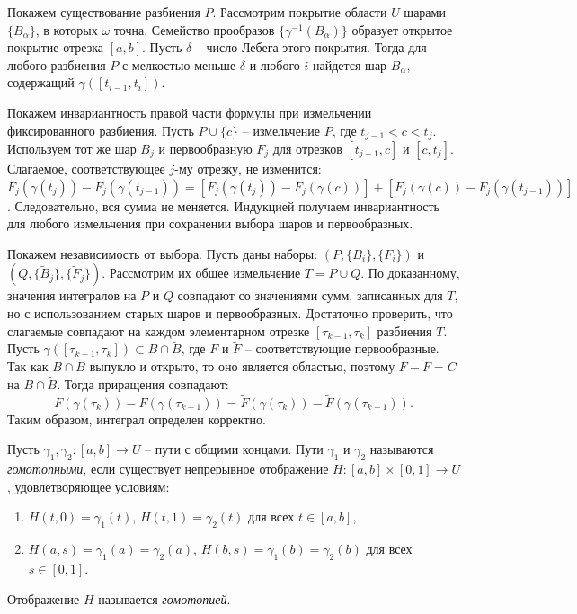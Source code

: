 \begin{myproof}
	Покажем существование разбиения $P$. 
	Рассмотрим покрытие области $U$ шарами $\{B_\alpha\}$, в которых $\omega$ точна. Семейство прообразов $\{\gamma^{-1}(B_\alpha)\}$ образует открытое покрытие отрезка $[a, b]$. Пусть $\delta$ -- число Лебега этого покрытия. Тогда для любого разбиения $P$ с мелкостью меньше $\delta$ и любого $i$ найдется шар $B_{\alpha}$, содержащий $\gamma([t_{i-1}, t_i])$.

	\vspace{5pt}
	Покажем инвариантность правой части формулы при измельчении фиксированного разбиения.
	Пусть $P \cup \{c\}$ -- измельчение $P$, где $t_{j-1} < c < t_j$. Используем тот же шар $B_j$ и первообразную $F_j$ для отрезков $[t_{j-1}, c]$ и $[c, t_j]$. Слагаемое, соответствующее $j$-му отрезку, не изменится:
 	$F_j(\gamma(t_j)) - F_j(\gamma(t_{j-1})) = \left[F_j(\gamma(t_j)) - F_j(\gamma(c))\right] + \left[F_j(\gamma(c)) - F_j(\gamma(t_{j-1}))\right]$.
	Следовательно, вся сумма не меняется. Индукцией получаем инвариантность для любого измельчения при сохранении выбора шаров и первообразных.

	\vspace{5pt}
	Покажем независимость от выбора.
	Пусть даны наборы: $(P, \{B_i\}, \{F_i\})$ и $(Q, \{\widetilde{B}_j\}, \{\widetilde{F}_j\})$. Рассмотрим их общее измельчение $T = P \cup Q$.
	По доказанному, значения интегралов на $P$ и $Q$ совпадают со значениями сумм, записанных для $T$, но с использованием старых шаров и первообразных. 
	Достаточно проверить, что слагаемые совпадают на каждом элементарном отрезке $[\tau_{k-1}, \tau_k]$ разбиения $T$. Пусть $\gamma([\tau_{k-1}, \tau_k]) \subset B \cap \widetilde{B}$, где $F$ и $\widetilde{F}$ -- соответствующие первообразные.
	Так как $B \cap \widetilde{B}$ выпукло и открыто, то оно является областью, поэтому $F - \widetilde{F} = C$ на $B \cap \widetilde{B}$. Тогда приращения совпадают:
	\[ F(\gamma(\tau_k)) - F(\gamma(\tau_{k-1})) = \widetilde{F}(\gamma(\tau_k)) - \widetilde{F}(\gamma(\tau_{k-1})). \]
	Таким образом, интеграл определен корректно.
\end{myproof}

\begin{definition}
	Пусть $\gamma_1, \gamma_2 : [a, b] \to U$ -- пути с общими концами.
	Пути $\gamma_1$ и $\gamma_2$ называются \textit{гомотопными}, если существует непрерывное отображение $H : [a, b] \times [0, 1] \to U$, удовлетворяющее условиям:
	\begin{enumerate}[itemsep = 0pt, topsep = 5pt]
		\item $H(t, 0) = \gamma_1(t)$, $H(t, 1) = \gamma_2(t)$ для всех $t \in [a, b]$,
		\item $H(a, s) = \gamma_1(a) = \gamma_2(a)$, $H(b, s) = \gamma_1(b) = \gamma_2(b)$ для всех $s \in [0, 1]$.
	\end{enumerate}
	Отображение $H$ называется \textit{гомотопией}.
\end{definition}

